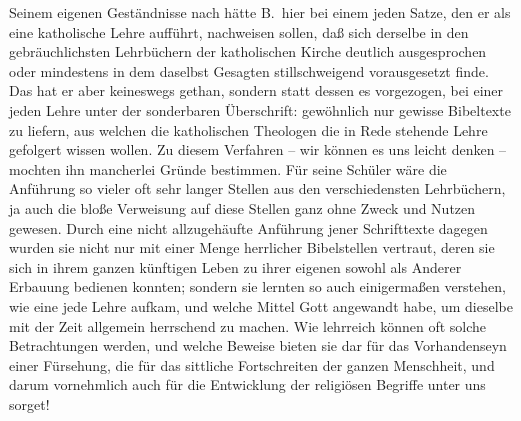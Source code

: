 Seinem eigenen Geständnisse nach hätte B.\ hier bei einem jeden Satze, den er als eine katholische Lehre aufführt, nachweisen sollen, daß sich derselbe in den gebräuchlichsten Lehrbüchern der katholischen Kirche deutlich ausgesprochen oder mindestens in dem daselbst Gesagten stillschweigend vorausgesetzt finde. Das hat er aber keineswegs gethan, sondern statt dessen es vorgezogen, bei einer jeden Lehre unter der sonderbaren Überschrift:  gewöhnlich nur gewisse Bibeltexte zu liefern, aus welchen die katholischen Theologen die in Rede stehende Lehre gefolgert wissen wollen. Zu diesem Verfahren -- wir können es uns leicht denken -- mochten ihn mancherlei Gründe bestimmen. Für seine Schüler wäre die Anführung so vieler oft sehr langer Stellen aus den verschiedensten Lehrbüchern, ja auch die  bloße Verweisung auf diese Stellen ganz ohne Zweck und Nutzen gewesen. Durch eine nicht allzugehäufte Anführung jener Schrifttexte dagegen wurden sie nicht nur mit einer Menge herrlicher Bibelstellen vertraut, deren sie sich in ihrem ganzen künftigen Leben zu ihrer eigenen sowohl als Anderer Erbauung bedienen konnten; sondern sie lernten so auch einigermaßen verstehen, wie eine jede Lehre aufkam, und welche Mittel Gott angewandt habe, um dieselbe mit der Zeit allgemein herrschend zu machen. Wie lehrreich können oft solche Betrachtungen werden, und welche Beweise bieten sie dar für das Vorhandenseyn einer Fürsehung, die für das sittliche Fortschreiten der ganzen Menschheit, und darum vornehmlich auch für die Entwicklung der religiösen Begriffe unter uns sorget! \par
